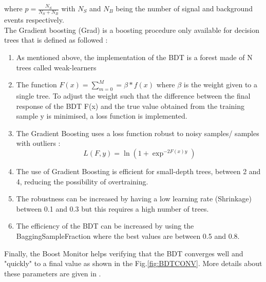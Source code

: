 \documentclass{cernatlasnote}
\begin{document}
 where $p = \frac{N_{S}}{N_{S}+N_{B}}$ with $N_{S}$ and $N_{B}$ being the number of signal and background events respectively.\\
 The Gradient boosting (Grad) is a boosting procedure only available for decision trees that is defined as followed :\\
 \begin{enumerate}
     \item As mentioned above, the implementation of the BDT is a forest made of N trees called weak-learners
     \item The function $F(x)= \sum^{M}_{m=0} = \beta * f(x)$ where $\beta$ is the weight given to a single tree. To adjust the weight such that the difference between the final response of the BDT F(x) and the true value obtained from the training sample y is minimised, a loss function is implemented.
     \item The Gradient Boosting uses a loss function robust to noisy samples/ samples with outliers :  \\
     \begin{equation}
         L(F,y) = \ln{(1+\exp^{-2F(x)y})}
     \end{equation}
     \item The use of Gradient Boosting is efficient for small-depth trees, between 2 and 4, reducing the possibility of overtraining. 
     \item The robustness can be increased by having a low learning rate (Shrinkage) between 0.1 and 0.3 but this requires a high number of trees.
     \item The efficiency of the BDT can be increased by using the BaggingSampleFraction where the best values are between 0.5 and 0.8.
 \end{enumerate}

Finally, the Boost Monitor helps verifying that the BDT converges well and "quickly" to a final value as shown in the Fig.\ref{fig:BDTCONV}. More details about these parameters are given in \cite{TMVA}.
\FloatBarrier
\end{document}
